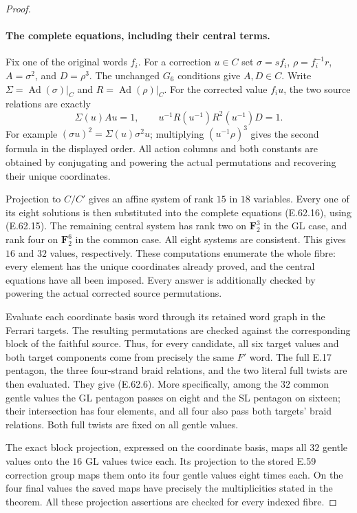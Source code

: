 \begin{proof}
\paragraph{The complete equations, including their central terms.}
Fix one of the original words $f_i$.  For a correction $u\in C$ set
$\sigma=sf_i$, $\rho=f_i^{-1}r$, $A=\sigma^2$, and $D=\rho^3$.
The unchanged $G_6$ conditions give $A,D\in C$.  Write
$\Sigma=\operatorname{Ad}(\sigma)|_C$ and
$R=\operatorname{Ad}(\rho)|_C$.  For the corrected value $f_i u$,
the two source relations are exactly
\[
 \Sigma(u)A u=1,\qquad
 u^{-1}R(u^{-1})R^2(u^{-1})D=1.
 \tag{E.62.16}
\]
For example $(\sigma u)^2=\Sigma(u)\sigma^2u$; multiplying
$(u^{-1}\rho)^3$ gives the second formula in the displayed order.
All action columns and both constants are obtained by conjugating and
powering the actual permutations and recovering their unique coordinates.

Projection to $C/C'$ gives an affine system of rank $15$ in $18$
variables.  Every one of its eight solutions is then substituted into
the complete equations \textup{(E.62.16)}, using
\textup{(E.62.15)}.  The remaining central system has rank two on
$\mathbf F_2^3$ in the GL case, and rank four on $\mathbf F_2^6$
in the common case.  All eight systems are consistent.  This gives
$16$ and $32$ values, respectively.  These computations enumerate
the whole fibre: every element has the unique coordinates already
proved, and the central equations have all been imposed.  Every
answer is additionally checked by powering the actual corrected
source permutations.

Evaluate each coordinate basis word through its retained word graph in
the Ferrari targets.  The resulting permutations are checked against
the corresponding block of the faithful source.  Thus, for every
candidate, all six target values and both target components come
from precisely the same $F'$ word.  The full E.17 pentagon, the three
four-strand braid relations, and the two literal full twists are then
evaluated.  They give \textup{(E.62.6)}.  More specifically, among the
$32$ common gentle values the GL pentagon passes on eight and the
SL pentagon on sixteen; their intersection has four elements, and
all four also pass both targets' braid relations.  Both full twists
are fixed on all gentle values.

The exact block projection, expressed on the coordinate basis, maps
all $32$ gentle values onto the $16$ GL values twice each.  Its
projection to the stored E.59 correction group maps them onto its
four gentle values eight times each.  On the four final values the
saved maps have precisely the multiplicities stated in the theorem.
All these projection assertions are checked for every indexed fibre.


\end{proof}
